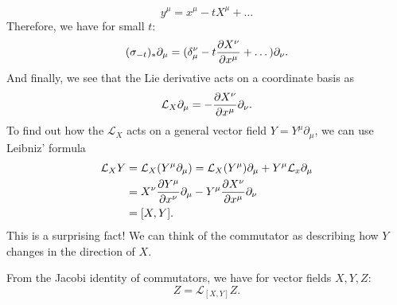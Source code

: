 \begin{equation}
  y^\mu = x^\mu -t X^\mu + \dots
\end{equation}
Therefore, we have for small $t$:
\begin{equation}
  (\sigma_{-t})_* \partial_\mu = (\delta^\nu_\mu -t \pdv{X^\nu}{x^\mu} + \dots) \partial_\nu.
\end{equation}
And finally, we see that the Lie derivative acts on a coordinate basis as
\begin{equation}
  \label{eq:3-1}
  \mathcal{L}_X \partial_\mu = -\pdv{X^\nu}{x^\mu} \partial_\nu.
\end{equation}
To find out how the $\mathcal{L}_X$ acts on a general vector field $Y = Y^\mu \partial_\mu$, we can use Leibniz' formula
\begin{align}
  \mathcal{L}_X Y &= \mathcal{L}_X (Y^\mu \partial_\mu) = \mathcal{L}_X (Y^\mu) \partial_\mu + Y^\mu \mathcal{L}_x \partial_\mu \\
		  &= X^\nu \pdv{Y^\mu}{x^\nu} \partial_\mu - Y^\mu \pdv{X^\nu}{x^\mu} \partial_\nu \\
		  &= [X, Y].
\end{align}
This is a surprising fact! We can think of the commutator as describing how $Y$ changes in the direction of $X$.
\begin{corollary}
  From the Jacobi identity of commutators, we have for vector fields $X, Y, Z$:
  \begin{equation}
    [\mathcal{L}_X, \mathcal{L}_Y] Z = \mathcal{L}_{[X, Y]}Z.
  \end{equation}
\end{corollary}
